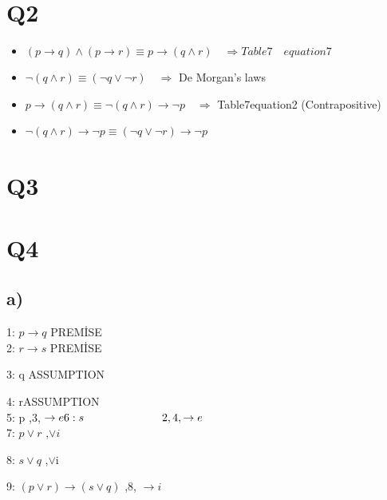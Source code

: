\documentclass{article}
\begin{document}
\section{Q2}
\begin{itemize}
    \item $ (p \rightarrow q) \land (p \rightarrow r) \equiv p\rightarrow (q \land r) \quad \Longrightarrow Table7 \quad equation7$
    \item $ \neg (q \land r) \equiv (\neg q \lor \neg r) \quad \Longrightarrow $ De \quad Morgan’s \quad laws 
    \item $ p\rightarrow (q \land r) \equiv \neg (q \land r) \rightarrow \neg p \quad \Longrightarrow $ Table7\quad equation2 (Contrapositive) 
    \item $ \neg (q \land r) \rightarrow \neg p \equiv (\neg q \lor \neg r) \rightarrow \neg p $ 
\end{itemize}
\section{Q3}

\section{Q4}
\subsection{a)}
\begin{mdframed}[]
1: $p \rightarrow q$ \quad\quad\quad\quad\quad PREMİSE \\
2: $r \rightarrow s$ \quad\quad\quad\quad\quad PREMİSE \\
\begin{mdframed}[]
3: q \quad \quad \quad\quad\quad\quad\quad ASSUMPTION \\
\begin{mdframed}[]
4: r\quad\quad\quad\quad\quad\quad\quad ASSUMPTION\\
5: p \quad \quad\quad\quad\quad\quad{},3, $\rightarrow e\\
6: s  \quad \quad\quad\quad\quad\quad\quad 2,4, \rightarrow e$\\
7: $p \lor r$ \quad\quad\quad\quad\quad{},$ \lor  i$\\
\end{mdframed}
8: $ s\lor q $ \quad{},$ \lor $i\\ 
\end{mdframed}
9: $(p\lor r) \rightarrow (s\lor q) $ ,8, $\rightarrow i$
\end{mdframed}
\newpage
\end{document}
